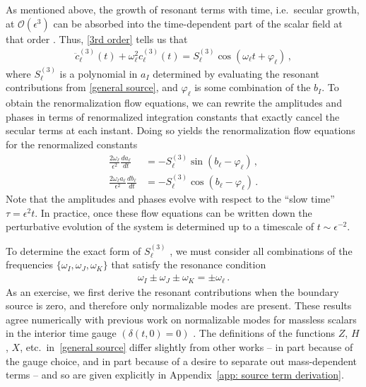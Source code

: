 \documentclass[letterpaper,11pt]{article}
\newcommand{\ol}{\omega_\ell}
\newcommand{\mc}{\mathcal}
\begin{document}
As mentioned above, the growth of resonant terms with time, i.e.~secular growth, at $\mc O(\epsilon^3)$ can be absorbed into the time-dependent part of the scalar field at that order \cite{hep-th/9506161}. Thus, \eqref{3rd order} tells us that
\begin{align}
\ddot c^{(3)}_\ell (t) + \ol^2 c^{(3)}_\ell(t) = S^{(3)}_\ell \cos \left( \ol t + \varphi_\ell \right) \, ,
\end{align}
where $S^{(3)}_\ell$ is a polynomial in $a_I$ determined by evaluating the resonant contributions from \eqref{general source}, and $\varphi_\ell$ is some combination of the $b_I$. To obtain the renormalization flow equations, we can rewrite the amplitudes and phases in terms of renormalized integration constants that exactly cancel the secular terms at each instant. Doing so yields the renormalization flow equations for the renormalized constants~\cite{1407.6273}
\begin{align}
\label{RN flow 1}
\frac{2 \ol}{\epsilon^2} \frac{d a_\ell}{d t} &= - S^{(3)}_\ell \sin \left( b_\ell - \varphi_\ell \right) \, , \\
\label{RN flow 2}
\frac{2 \ol a_\ell}{\epsilon^2} \frac{d b_\ell}{d t} &= - S^{(3)}_\ell \cos \left( b_\ell - \varphi_\ell \right) \, .
\end{align}
Note that the amplitudes and phases evolve with respect to the ``slow time'' $\tau = \epsilon^2 t$. In practice, once these flow equations can be written down the perturbative evolution of the system is determined up to a timescale of $t \sim \epsilon^{-2}$.

To determine the exact form of $S^{(3)}_\ell$ , we must consider all combinations of the frequencies ${\{ \omega_I, \omega_J, \omega_K\}}$ that satisfy the resonance condition
\begin{align}
\label{gen res}
\omega_I \pm \omega_J \pm \omega_K = \pm \ol \, .
\end{align}
As an exercise, we first derive the resonant contributions when the boundary source is zero, and therefore only normalizable modes are present. These results agree numerically with previous work on normalizable modes for massless scalars in the interior time gauge ${(\delta(t, 0) = 0)}$ \cite{1810.04753}. The definitions of the functions $Z$, $H$, $X$, etc.~in~\eqref{general source} differ slightly from other works -- in part because of the gauge choice, and in part because of a desire to separate out mass-dependent terms -- and so are given explicitly in Appendix~\ref{app: source term derivation}.
\end{document}
